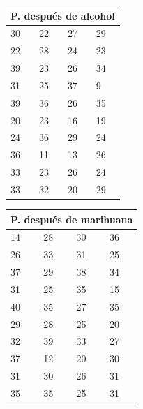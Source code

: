 \documentclass[a4paper]{report}
\begin{document}
\begin{center}
    \begin{tabular}{ |p{0.7cm}|p{0.7cm}|p{0.7cm}|p{0.7cm}| }
        \hline
            \multicolumn{4}{|c|}{P. después de alcohol } \\
        \hline
            30 & 22 & 27 & 29  \\
            22 & 28 & 24 & 23  \\
            39 & 23 & 26 & 34  \\
            31 & 25 & 37 & 9   \\
            39 & 36 & 26 & 35  \\
            20 & 23 & 16 & 19  \\
            24 & 36 & 29 & 24  \\
            36 & 11 & 13 & 26  \\
            33 & 23 & 26 & 24  \\
            33 & 32 & 20 & 29  \\
        \hline
    \end{tabular}
    \begin{tabular}{ |p{0.7cm}|p{0.7cm}|p{0.7cm}|p{0.7cm}| }
        \hline
        \multicolumn{4}{|c|}{ P. después de marihuana} \\ 
         
        \hline
            14 & 28 & 30 & 36 \\
            26 & 33 & 31 & 25 \\
            37 & 29 & 38 & 34 \\
            31 & 25 & 35 & 15 \\
            40 & 35 & 27 & 35 \\
            29 & 28 & 25 & 20 \\
            32 & 39 & 33 & 27 \\
            37 & 12 & 20 & 30 \\
            31 & 30 & 26 & 31 \\
            35 & 35 & 25 & 31 \\
        \hline
    \end{tabular}
\end{center}
\end{document}
